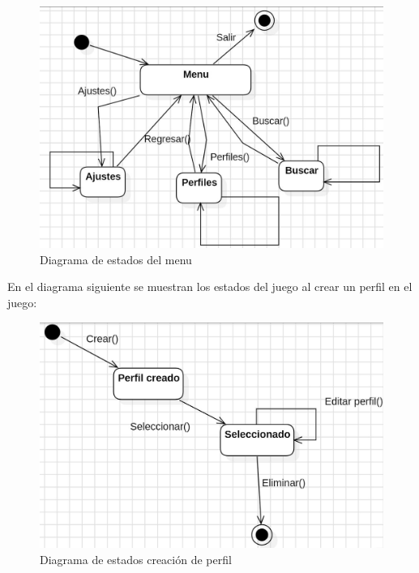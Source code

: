 \documentclass[12pt, oneside, letterpaper]{book}
\begin{document}
\begin{figure}[h]
    \begin{flushleft}
        \includegraphics[width=1.3\textwidth]{DiagramaEstadosMenuFN.jpeg}
        \caption{Diagrama de estados del menu}
        \label{DEMFN}
    \end{flushleft}
\end{figure}

\par 
En el diagrama siguiente se muestran los estados del juego al crear un perfil en el juego:  

\begin{figure}[]
    \begin{flushleft}
        \includegraphics[width=1.2\textwidth]{DiagramaEstadosCrearPerfilFN.jpeg}
        \caption{Diagrama de estados creación de perfil}
        \label{DEFN}
    \end{flushleft}
\end{figure}
\bigskip
\end{document}
